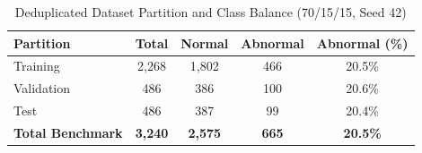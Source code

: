 \begin{table}[t]
\centering
\caption{Deduplicated Dataset Partition and Class Balance (70/15/15, Seed 42)}
\label{tab:split_dedup}
\begin{tabular}{lcccc}
\toprule
\textbf{Partition} & \textbf{Total} & \textbf{Normal} & \textbf{Abnormal} & \textbf{Abnormal (\%)} \\
\midrule
Training   & 2,268 & 1,802 & 466 & 20.5\% \\
Validation &   486 &   386 & 100 & 20.6\% \\
Test       &   486 &   387 &  99 & 20.4\% \\
\midrule
\textbf{Total Benchmark} & \textbf{3,240} & \textbf{2,575} & \textbf{665} & \textbf{20.5\%} \\
\bottomrule
\end{tabular}
\end{table}
